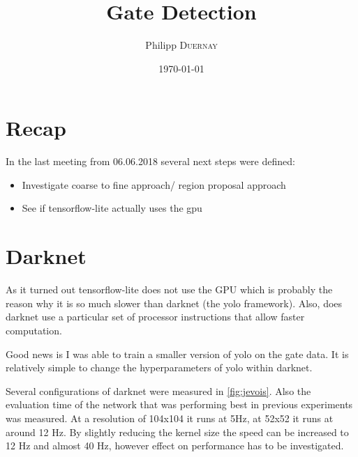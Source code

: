 \documentclass{article}
\title{Gate Detection} %
\author{Philipp \textsc{Duernay}} %
\date{\today} %
\begin{document}
\maketitle


\section{Recap}
In the last meeting from 06.06.2018 several next steps were defined:
\begin{itemize}
	\item Investigate coarse to fine approach/ region proposal approach
	\item See if tensorflow-lite actually uses the gpu
\end{itemize}


\section{Darknet}

As it turned out tensorflow-lite does not use the GPU which is probably the reason why it is so much slower than darknet (the yolo framework). Also, does darknet use a particular set of processor instructions that allow faster computation.

Good news is I was able to train a smaller version of yolo on the gate data. It is relatively simple to change the hyperparameters of yolo within darknet. 

Several configurations of darknet were measured in \autoref{fig:jevois}. Also the evaluation time of the network that was performing best in previous experiments was measured. At a resolution of 104x104 it runs at 5Hz, at 52x52 it runs at around 12 Hz. By slightly reducing the kernel size the speed can be increased to 12 Hz and almost 40 Hz, however effect on performance has to be investigated.
\end{document}
